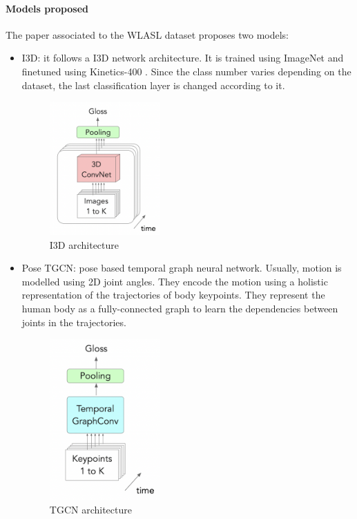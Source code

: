\paragraph{Models proposed} The paper associated to the WLASL dataset proposes two models:
\begin{itemize}[noitemsep]
    \item I3D: it follows a I3D network architecture. It is trained using ImageNet \cite{ImageNet} 
    and finetuned using Kinetics-400 \cite{Kinetics400}. Since the class number varies depending on
    the dataset, the last classification layer is changed according to it. \\
    \begin{figure}[H]
        \centering
            \includegraphics[width=0.4\textwidth]{assets/i3d.png}
        \caption{I3D architecture}
        \label{fig:introduction_i3d}
    \end{figure}
    \item Pose TGCN: pose based temporal graph neural network. Usually, motion is modelled using 2D joint angles.
    They encode the motion using a holistic representation of the trajectories of body keypoints. They represent
    the human body as a fully-connected graph to learn the dependencies between joints in the trajectories.
    \begin{figure}[H]
        \centering
            \includegraphics[width=0.4\textwidth]{assets/tgcn.png}
        \caption{TGCN architecture}
        \label{fig:introduction_tgcn}
    \end{figure}
\end{itemize}

